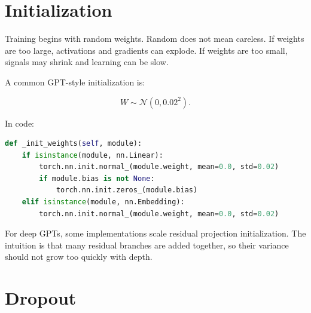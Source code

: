 \section{Initialization}

Training begins with random weights. Random does not mean careless. If weights are too large, activations and gradients can explode. If weights are too small, signals may shrink and learning can be slow.

A common GPT-style initialization is:

\[
W\sim\mathcal{N}(0,0.02^2).
\]

In code:

\begin{lstlisting}[language=Python]
def _init_weights(self, module):
    if isinstance(module, nn.Linear):
        torch.nn.init.normal_(module.weight, mean=0.0, std=0.02)
        if module.bias is not None:
            torch.nn.init.zeros_(module.bias)
    elif isinstance(module, nn.Embedding):
        torch.nn.init.normal_(module.weight, mean=0.0, std=0.02)
\end{lstlisting}

\begin{center}
\end{center}

For deep GPTs, some implementations scale residual projection initialization. The intuition is that many residual branches are added together, so their variance should not grow too quickly with depth.

\section{Dropout}

